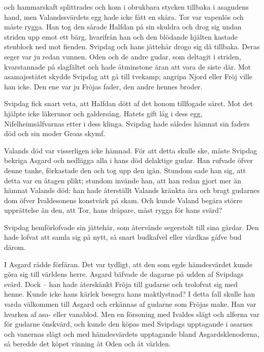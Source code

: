 och hammarskaft splittrades och kom i obrukbara stycken tillbaka i
asagudens hand, men Valandssvärdets egg hade icke fått en skåra. Tor var
vapenlös och måste rygga. Han tog den sårade Halfdan på sin skuldra och
drog sig undan striden upp emot ett bärg, hvarifrån han och den blödande
hjälten kastade stenblock ned mot fienden. Svipdag och hans jättehär
drogo sig då tillbaka. Deras seger var ju redan vunnen. Oden och de
andre gudar, som deltagit i striden, kvarstannade på slagfältet och hade
åtminstone äran att vara de siste där. Mot asamajestätet skydde Svipdag
att gå till tvekamp; angripa Njord eller Fröj ville han icke. Den ene
var ju Fröjas fader, den andre hennes broder.

Svipdag fick snart veta, att Halfdan dött af det honom tillfogade såret.
Mot det hjälpte icke läkerunor och galdersång. Hatets gift låg i dess
egg, Nifelheimsälfvarnas etter i dess klinga. Svipdag hade således
hämnat sin faders död och sin moder Groas skymf.

Valands död var visserligen icke hämnad. För att detta skulle ske, måste
Svipdag bekriga Asgard och nedlägga alla i hans död delaktige gudar. Han
rufvade öfver denne tanke, förkastade den och tog upp den igän. Stundom
sade han sig, att detta var en åtagen plikt; stundom invände han, att
han redan gjort mer än hämnat Valands död: han hade återställt Valands
kränkta ära och bragt gudarnes dom öfver Ivaldesonens konstvärk på skam.
Och kunde Valand begära större upprättelse än den, att Tor, hans
dråpare, måst rygga för hans svärd?

Svipdag hemförlofvade sin jättehär, som återvände segerstolt till sina
gårdar. Den hade lofvat att samla sig på nytt, så snart budkafvel eller
vårdkas gåfve bud därom.

I Asgard rådde förfäran. Det var tydligt, att den som egde hämdesvärdet
kunde göra sig till världens herre. Asgard bäfvade de dagarne på udden
af Svipdags svärd. Dock -- han hade återskänkt Fröja till gudarne och
trolofvat sig med henne. Kunde icke hans kärlek besegra hans
maktlystnad? I detta fall skulle han varda välkommen till Asgard och
erkännas
af gudarne som Fröjas make. Han var hvarken af asa- eller vanablod. Men
en försoning med Ivaldes slägt och alferna var för gudarne önskvärd, och
kunde den köpas med Svipdags upptagande i asarnes och vanernas slägt och
med hämdesvärdets upptagande bland Asgardsklenoderna, så beredde det
köpet vinning åt Oden och åt världen.



